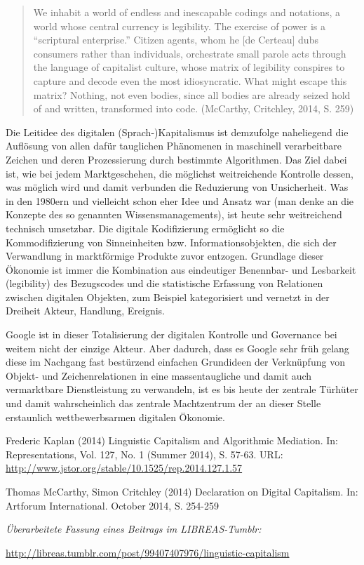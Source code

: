 \documentclass[a4paper,
fontsize=11pt,
oneside,
numbers=noperiodatend,
parskip=half-,
bibliography=totoc,
final
]{scrartcl}
\begin{document}
\begin{quote}
We inhabit a world of endless and inescapable codings and notations, a
world whose central currency is legibility. The exercise of power is a
\enquote{scriptural enterprise.} Citizen agents, whom he {[}de
Certeau{]} dubs consumers rather than individuals, orchestrate small
parole acts through the language of capitalist culture, whose matrix of
legibility conspires to capture and decode even the most idiosyncratic.
What might escape this matrix? Nothing, not even bodies, since all
bodies are already seized hold of and written, transformed into code.
(McCarthy, Critchley, 2014, S. 259)
\end{quote}

Die Leitidee des digitalen (Sprach-)Kapitalismus ist demzufolge
naheliegend die Auflösung von allen dafür tauglichen Phänomenen in
maschinell verarbeitbare Zeichen und deren Prozessierung durch bestimmte
Algorithmen. Das Ziel dabei ist, wie bei jedem Marktgeschehen, die
möglichst weitreichende Kontrolle dessen, was möglich wird und damit
verbunden die Reduzierung von Unsicherheit. Was in den 1980ern und
vielleicht schon eher Idee und Ansatz war (man denke an die Konzepte des
so genannten Wissensmanagements), ist heute sehr weitreichend technisch
umsetzbar. Die digitale Kodifizierung ermöglicht so die Kommodifizierung
von Sinneinheiten bzw. Informationsobjekten, die sich der Verwandlung in
marktförmige Produkte zuvor entzogen. Grundlage dieser Ökonomie ist
immer die Kombination aus eindeutiger Benennbar- und Lesbarkeit
(legibility) des Bezugscodes und die statistische Erfassung von
Relationen zwischen digitalen Objekten, zum Beispiel kategorisiert und
vernetzt in der Dreiheit Akteur, Handlung, Ereignis.

Google ist in dieser Totalisierung der digitalen Kontrolle und
Governance bei weitem nicht der einzige Akteur. Aber dadurch, dass es
Google sehr früh gelang diese im Nachgang fast bestürzend einfachen
Grundideen der Verknüpfung von Objekt- und Zeichenrelationen in eine
massentaugliche und damit auch vermarktbare Dienstleistung zu
verwandeln, ist es bis heute der zentrale Türhüter und damit
wahrscheinlich das zentrale Machtzentrum der an dieser Stelle
erstaunlich wettbewerbsarmen digitalen Ökonomie.

Frederic Kaplan (2014) Linguistic Capitalism and Algorithmic Mediation.
In: Representations, Vol. 127, No. 1 (Summer 2014), S. 57-63. URL:
\url{http://www.jstor.org/stable/10.1525/rep.2014.127.1.57}

Thomas McCarthy, Simon Critchley (2014) Declaration on Digital
Capitalism. In: Artforum International. October 2014, S. 254-259

\emph{Überarbeitete Fassung eines Beitrags im LIBREAS-Tumblr:}

\url{http://libreas.tumblr.com/post/99407407976/linguistic-capitalism}

\end{document}

